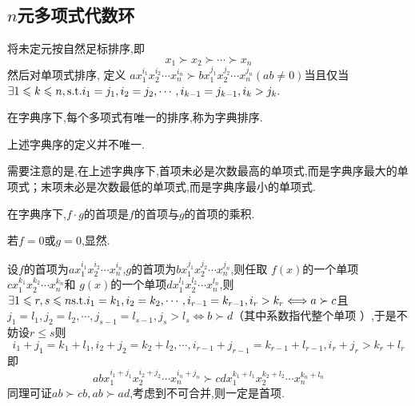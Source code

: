 \subsection{$n$元多项式代数环}
\begin{formal}
\begin{definition}[字典序]\label{def:字典序}
    将未定元按自然足标排序,即
    \[
    x_1\succ 
    x_2\succ\cdots\succ x_n
    \]
    然后对单项式排序,
    定义
    $\displaystyle
    ax_1^{i_1}x_2^{i_2}\cdots x_n^{i_n}\succ bx_{1}^{j_1}x_2^{j_2}\cdots x_n^{j_n}\left(ab\neq 0\right)$当且仅当
    $\exists 1\leqslant k\leqslant n,\textup{s.t.}i_1=j_1,i_2=j_2,\cdots,i_{k-1}=j_{k-1},i_k>j_k.$
\end{definition}
\end{formal}
\begin{green}
\begin{corollary}[字典序带来的唯一性]\label{cor:字典序带来的唯一性}
    在字典序下,每个多项式有唯一的排序,称为字典排序.
\end{corollary}
\end{green}
\begin{red}
\begin{remark}
    上述字典序的定义并不唯一.
\end{remark}
\end{red}
\begin{red}
\begin{remark}
    需要注意的是,在上述字典序下,首项未必是次数最高的单项式,而是字典序最大的单项式；末项未必是次数最低的单项式,而是字典序最小的单项式.
\end{remark}
\end{red}
\begin{green}
\begin{lemma}[首项维持]\label{lem:首项维持}
    在字典序下,$f\cdot g$的首项是$f$的首项与$g$的首项的乘积.
\end{lemma}
\begin{Proof}
若$f=0$或$g=0$,显然.

设$f$的首项为$ax_1^{i_1}x_2^{i_2}\cdots x_n^{i_n}$,$g$的首项为$bx_1^{j_1}x_2^{j_2}\cdots x_n^{j_n}$,则任取
$f\left(x\right)$的一个单项$cx_1^{k_1}x_2^{k_2}\cdots x_n^{k_n}$和
$g\left(x\right)$的一个单项$dx_1^{l_1}x_2^{l_2}\cdots x_n^{l_n}$,则$\exists 1\leqslant r,s\leqslant n\textup{s.t.}
i_1=k_1,i_2=k_2,\cdots,i_{r-1}=k_{r-1},i_r>k_r\Longleftrightarrow
a\succ c$且$j_1=l_1,j_2=l_2,\cdots,j_{s-1}=l_{s-1},j_s>l_s
\Longleftrightarrow b\succ d
$（其中系数指代整个单项
）,于是不妨设$r\leqslant s$则
\[
i_1+j_1=k_1+l_1,i_2+j_2=k_2+l_2,
\cdots,i_{r-1}+j_{r-1}=k_{r-1}+l_{r-1},i_r+j_r>k_r+l_r
\]
即
\[
ab x_1^{i_1+j_1}x_2^{i_2+j_2}\cdots x_n^{i_n+j_n}\succ cd x_1^{k_1+l_1}x_2^{k_2+l_2}\cdots x_n^{k_n+l_n}
\]
同理可证$ab\succ cb,ab\succ ad$,考虑到不可合并,则一定是首项.
\end{Proof}
\end{green}
